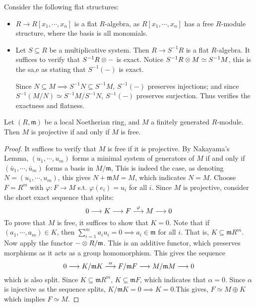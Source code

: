 \documentclass{article}
\begin{document}
\begin{example}
    Consider the following flat structures:
    \begin{itemize}
        \item $R \to R[x_1, \cdots, x_n]$ is a flat $R$-algebra, as $R[x_1, \cdots, x_n]$ has a free $R$-module structure, where the basis is all monomials.
        \item Let $S \subseteq R$ be a multiplicative system. Then $R \to S^{-1}R$ is a flat $R$-algebra. It suffices to verify that $S^{-1}R \otimes -$ is exact. Notice $S^{-1}R \otimes M \simeq S^{-1}M$, this is the sa,e as stating that $S^{-1}(-)$ is exact. 
        
        Since $N \subseteq M \implies S^{-1}N \subseteq S^{-1}M$, $S^{-1}(-)$ preserves injections; and since $S^{-1}(M/N) \simeq S^{-1}M/ S^{-1}N$, $S^{-1}(-)$ preserves surjection. Thus verifies the exactness and flatness.
    \end{itemize}
\end{example}

\begin{proposition}
    Let $(R, \mathfrak{m})$ be a local Noetherian ring, and $M$ a finitely generated $R$-module. Then $M$ is projective if and only if $M$ is free. 
\end{proposition}

\begin{proof}
    It suffices to verify that $M$ is free if it is projective. By Nakayama's Lemma, $(u_1, \cdots, u_m)$ forms a minimal system of generators of $M$ if and only if $(\bar{u}_1, \cdots, \bar{u}_m)$ forms a basis in $M/\mathfrak{m}$, This is indeed the case, as denoting $N = (u_1, \cdots, u_m)$, this gives $N + \mathfrak{m}M = M$, which indicates $N = M$. Choose $F = R^m$ with $\varphi: F \to M$ s.t. $\varphi(e_i) = u_i$ for all $i$. Since $M$ is projective, consider the short exact sequence that splits:
    \[
        0 \longrightarrow K \longrightarrow F \overset{\varphi}{\longrightarrow} M \longrightarrow 0
    \]
    To prove that $M$ is free, it suffices to show that $K = 0$. Note that if $(a_1, \cdots, a_m) \in K$, then $\sum_{i=1}^m a_iu_i = 0 \implies a_i \in \mathfrak{m}$ for all $i$. That is, $K \subseteq \mathfrak{m} R^m$. Now apply the functor $-\otimes R/\mathfrak{m}$. This is an additive functor, which preserves morphisms as it acts as a group homomorphism. This gives the sequence
    \[
        0 \longrightarrow K/\mathfrak{m}K \overset{\alpha}{\longrightarrow} F/\mathfrak{m}F \longrightarrow M/\mathfrak{m}M \longrightarrow 0
    \] 
    which is also split. Since $K \subseteq \mathfrak{m} R^m$, $K \subseteq \mathfrak{m}F$, which indicates that $\alpha = 0$. Since $\alpha$ is injective as the sequence splits, $K / \mathfrak{m}K = 0 \implies K = 0$.This gives, $F \simeq M \oplus K$ which implies $F \simeq M$. 
\end{proof}
\end{document}
